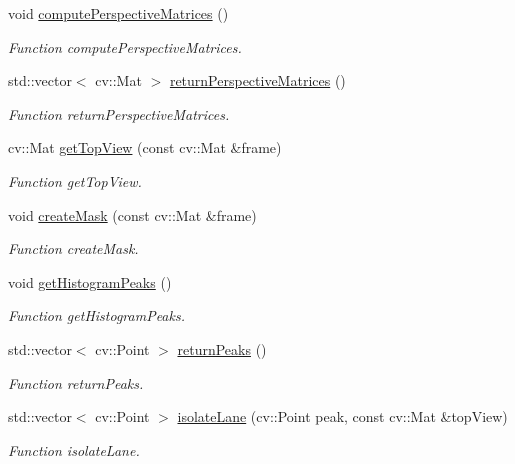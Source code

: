 \begin{DoxyCompactItemize}
void \hyperlink{classVisionModule_abd63e180582cef1e7ea78572be1c9325}{compute\+Perspective\+Matrices} ()
\begin{DoxyCompactList}\small\item\em Function compute\+Perspective\+Matrices. \end{DoxyCompactList}\item 
std\+::vector$<$ cv\+::\+Mat $>$ \hyperlink{classVisionModule_acec716f4e141ce0d73e2b6e535c4050f}{return\+Perspective\+Matrices} ()
\begin{DoxyCompactList}\small\item\em Function return\+Perspective\+Matrices. \end{DoxyCompactList}\item 
cv\+::\+Mat \hyperlink{classVisionModule_aa632f8351221993c5e69cc27b8016385}{get\+Top\+View} (const cv\+::\+Mat \&frame)
\begin{DoxyCompactList}\small\item\em Function get\+Top\+View. \end{DoxyCompactList}\item 
void \hyperlink{classVisionModule_a883ee8ac87edef9ef6988008149c8f0c}{create\+Mask} (const cv\+::\+Mat \&frame)
\begin{DoxyCompactList}\small\item\em Function create\+Mask. \end{DoxyCompactList}\item 
void \hyperlink{classVisionModule_afc8709c69a1fedc95d1799bee0991473}{get\+Histogram\+Peaks} ()
\begin{DoxyCompactList}\small\item\em Function get\+Histogram\+Peaks. \end{DoxyCompactList}\item 
std\+::vector$<$ cv\+::\+Point $>$ \hyperlink{classVisionModule_a884fdcb63f2c845818edbd203f1e9c52}{return\+Peaks} ()
\begin{DoxyCompactList}\small\item\em Function return\+Peaks. \end{DoxyCompactList}\item 
std\+::vector$<$ cv\+::\+Point $>$ \hyperlink{classVisionModule_a6c892c2a5c30176540e99590f01bb86a}{isolate\+Lane} (cv\+::\+Point peak, const cv\+::\+Mat \&top\+View)
\begin{DoxyCompactList}\small\item\em Function isolate\+Lane. \end{DoxyCompactList}\item 

\end{DoxyCompactItemize}
